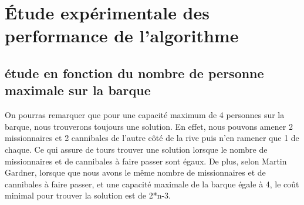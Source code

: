\documentclass[a4paper, 12pt, french,oneside]{book}
\begin{document}
\chapter{Étude expérimentale des performance de l'algorithme}
\section{étude en fonction du nombre de personne maximale sur la barque}
On pourras remarquer que pour une capacité maximum de 4 personnes sur la barque, nous trouverons toujours une solution. En effet, nous pouvons amener 2 missionnaires et 2 cannibales de l'autre côté de la rive puis n'en ramener que 1 de chaque. Ce qui assure de tours trouver une solution lorsque le nombre de missionnaires et de cannibales à faire passer sont égaux. De plus, selon Martin Gardner, lorsque que nous avons le même nombre de missionnaires et de cannibales à faire passer, et une capacité maximale de la barque égale à 4, le coût minimal pour trouver la solution est de 2*n-3.
\end{document}
